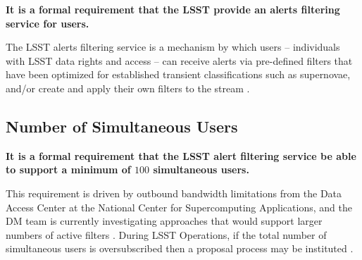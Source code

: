 \documentclass[DM,authoryear,toc]{lsstdoc}
\begin{document}
{\bf It is a formal requirement that the LSST provide an alerts filtering service for users.} 

The LSST alerts filtering service is a mechanism by which users -- individuals with LSST data rights and access -- can receive alerts via pre-defined filters that have been optimized for established transient classifications such as supernovae, and/or create and apply their own filters to the stream . 



\subsection{Number of Simultaneous Users}\label{ssec:LAFS_users}

{\bf It is a formal requirement that the LSST alert filtering service be able to support a minimum of $100$ simultaneous users.}

This requirement is driven by outbound bandwidth limitations from the Data Access Center at the National Center for Supercomputing Applications, and the DM team is currently investigating approaches that would support larger numbers of active filters . During LSST Operations, if the total number of simultaneous users is oversubscribed then a proposal process may be instituted .


\end{document}
